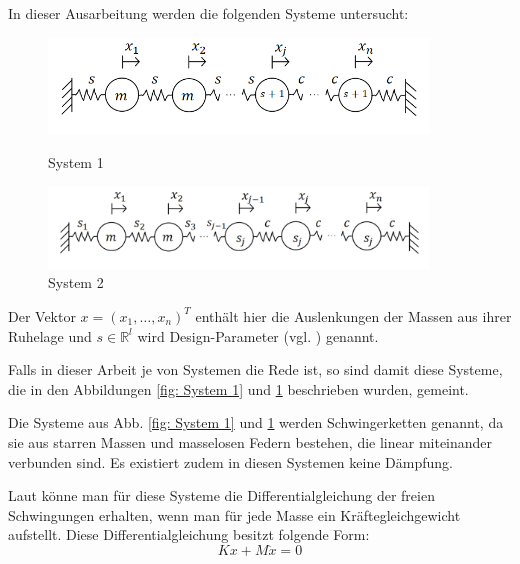 \documentclass[a4paper,12pt]{report}
\newcommand{\R}{\mathbb R}
\newcommand{\zitat}[1]{\glqq #1\grqq}
\newcommand{\1}{\mathds{1}}
\theoremstyle{plain} %
\theoremstyle{definition} %
\theoremstyle{remark}
\begin{document}
      In dieser Ausarbeitung werden die folgenden Systeme untersucht:
      \begin{figure}[h!t]
            \centering
            \begin{minipage}[ht]{0.49\linewidth}
                  \centering
                  \includegraphics[width=0.9\textwidth, keepaspectratio]{./System1.png}
                  \caption{System 1}
                  \label{fig: System 1}
            \end{minipage}
            \hfill
            \begin{minipage}[ht]{0.49\linewidth}
                  \centering
                  \includegraphics[width=0.9\textwidth, keepaspectratio]{./System2.png}
                  \caption{System 2}
                  \label{fig: System 2}
            \end{minipage}
      \end{figure}

      Der Vektor $x = (x_1,\dots,x_n)^T$ enthält hier die Auslenkungen der Massen aus ihrer Ruhelage und $s\in\R^l$ wird Design-Parameter (vgl. \cite[S. 2]{hauptteilTkachuk}) genannt.

      Falls in dieser Arbeit je von \zitat{Systemen} die Rede ist, so sind damit diese Systeme, die in den Abbildungen \ref{fig: System 1} und \ref{fig: System 2} beschrieben wurden, gemeint.

      Die Systeme aus Abb. \ref{fig: System 1} und \ref{fig: System 2} werden \zitat{Schwingerketten}\cite[S. 236]{maschinendynamikDresig} genannt, da sie aus starren Massen und masselosen Federn bestehen, die linear miteinander verbunden sind.
      Es existiert zudem in diesen Systemen keine Dämpfung.
      
      Laut \cite[S. 362-365]{maschinendynamikDresig} könne man für diese Systeme die \zitat{Differentialgleichung der freien Schwingungen}\cite[S. 365]{maschinendynamikDresig} erhalten, wenn man für jede Masse ein Kräftegleichgewicht aufstellt.
      Diese Differentialgleichung besitzt folgende Form:
      \begin{equation}
            \label{eqn: Dgl freie Schwingungen}
            Kx+M\ddot x = 0
      \end{equation}
\end{document}

